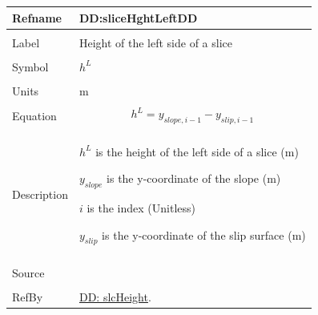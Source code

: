 \documentclass[12pt]{article}
\begin{document}
\noindent \begin{minipage}{\textwidth}
\begin{tabular}{p{} p{}}
\toprule \textbf{Refname} & \textbf{DD:sliceHghtLeftDD}
\label{DD:sliceHghtLeftDD}
\\ \midrule \\
Label & Height of the left side of a slice
        \\ \midrule \\
        Symbol & ${h^{L}}$
                 \\ \midrule \\
                 Units & m
                         \\ \midrule \\
                         Equation & \begin{displaymath}
                                    {h^{L}}={y_{slope,i-1}}-{y_{slip,i-1}}
                                    \end{displaymath}
                                    \\ \midrule \\
                                    Description & \begin{symbDescription}
                                                  \item{${h^{L}}$ is the height of the left side of a slice (m)}
                                                  \item{${y_{slope}}$ is the y-coordinate of the slope (m)}
                                                  \item{$i$ is the index (Unitless)}
                                                  \item{${y_{slip}}$ is the y-coordinate of the slip surface (m)}
                                                  \end{symbDescription}
                                                  \\ \midrule \\
                                                  Source & \\ \midrule \\
                                                           RefBy & \hyperref[DD:slcHeight]{DD: slcHeight}.
\\ \bottomrule \end{tabular}
\end{minipage}
\par~
\end{document}
